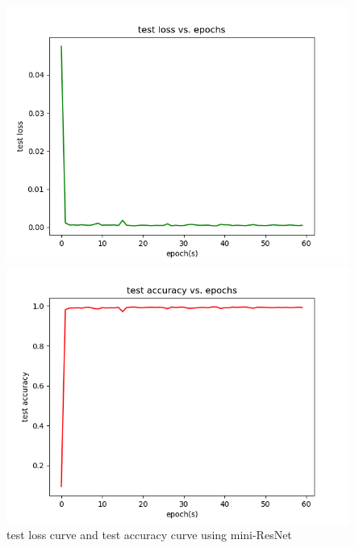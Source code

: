 \documentclass{elegantbook}
\begin{document}
\begin{figure}[!h]
	\centering
	\begin{minipage}[t]{0.48\textwidth}
		\centering
		\includegraphics[width=\textwidth]{../results/testloss-resnet}
	\end{minipage}
	\begin{minipage}[t]{0.48\textwidth}
		\centering
		\includegraphics[width=\textwidth]{../results/testacc-resnet}
	\end{minipage}
	\caption{\label{testres-resnet}test loss curve and test accuracy curve using mini-ResNet}
\end{figure}
\end{document}
